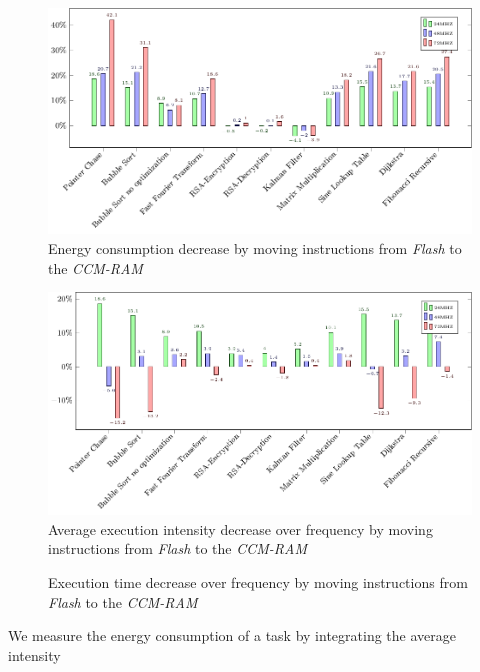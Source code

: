 \documentclass[conference]{IEEEtran}
\begin{document}
\begin{center}
    \begin{figure}[htb]
        \centering
        \includegraphics*{plot/code_ccm_energy}
        \caption[format=hang]{Energy consumption decrease by moving instructions
        from \emph{Flash} to the \emph{CCM-RAM}} \label{fig:code_ccm_energy}
    \end{figure}
    \begin{figure}[htb]
        \includegraphics*{plot/code_ccm_intensity}
        \caption[format=hang]{Average execution intensity decrease over
        frequency by moving instructions from \emph{Flash} to the
        \emph{CCM-RAM}} \label{fig:code_ccm_intensity}
    \end{figure}
   \begin{figure}[htb]     
        
        \caption[format=hang]{Execution time decrease over frequency by moving
        instructions from \emph{Flash} to the \emph{CCM-RAM}}
        \label{fig:code_ccm_intensity}
    \end{figure}
\end{center}
\clearpage
We measure the energy consumption of a task by integrating the average intensity
\end{document}
